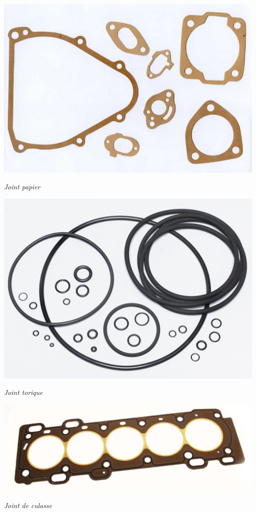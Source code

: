 \documentclass[11pt,oneside]{article}
\begin{document}
\noindent\begin{minipage}[c]{.3\linewidth}
\begin{center}
\includegraphics[width=.9\textwidth]{png/papier}

\textit{Joint papier \cite{papier}}
\end{center}
\end{minipage}\hfill
\begin{minipage}[c]{.3\linewidth}
\begin{center}
\includegraphics[width=.9\textwidth]{png/torique}

\textit{Joint torique \cite{torique}}
\end{center}
\end{minipage}\hfill
\begin{minipage}[c]{.3\linewidth}
\begin{center}
\includegraphics[width=.9\textwidth]{png/culasse}

\textit{Joint de culasse \cite{culasse}}
\end{center}
\end{minipage}
\end{document}
